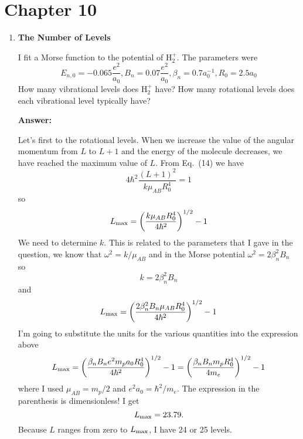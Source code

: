 
\section{Chapter 10} 
\begin{enumerate}
\item{\bf The Number of Levels}

I fit a Morse function to the potential of  H$_2^+$.  The parameters
were
\begin{equation}
E_{n,0} = -0.065 \frac{e^2}{a_0}, B_n = 0.07 \frac{e^2}{a_0}, \beta_n
= 0.7 a_0^{-1}, R_0 = 2.5 a_0
\end{equation}
How many vibrational levels does H$_2^+$ have?   How many rotational
levels does each vibrational level typically have?

{\bf Answer:}

Let's first to the rotational levels.  When we increase the value
of the angular momentum from $L$ to $L+1$ and the energy of the
molecule decreases, we have reached the maximum value of $L$.  From
Eq.~(14) we have
\begin{equation}
4 \hbar^2 \frac{(L+1)^2}{k \mu_{AB} R_0^4} = 1
\end{equation}
so
\begin{equation}
L_{\hbox{\rm \scriptsize max}} = \left ( \frac{k \mu_{AB} R_0^4}{4 \hbar^2} \right )^{1/2} - 1
\end{equation}
We need to determine $k$.  This is related to the parameters that I
gave in the question, we know that $\omega^2 = k/\mu_{AB}$ and in the Morse
potential $\omega^2 = 2 \beta_n^2 B_n$ so
\begin{equation}
k = 2\beta_n^2 B_n 
\end{equation}
and
\begin{equation}
L_{\hbox{\rm \scriptsize max}} = \left ( \frac{2 \beta_n^2 B_n  \mu_{AB} R_0^4}{4 \hbar^2} \right )^{1/2} - 1
\end{equation}
I'm going to substitute the units for the various quantities into the
expression above
\begin{equation}
L_{\hbox{\rm \scriptsize max}} = \left ( \frac{\beta_n B_n e^2 m_p a_0 R_0^4}{4
  \hbar^2} \right )^{1/2} - 1 = \left ( \frac{\beta_n B_n m_p R_0^4}{4 m_e} \right )^{1/2} - 1 
\end{equation}
where I used $\mu_{AB}=m_p/2$ and $e^2 a_0=\hbar^2/m_e$.  The
expression in the parenthesis is dimensionless!  I get
\begin{equation}
L_{\hbox{\rm \scriptsize max}} = 23.79.
\end{equation}
Because $L$ ranges from zero to $L_{\hbox{\rm \scriptsize max}}$, I have 24 or 25
levels.


\end{enumerate}
